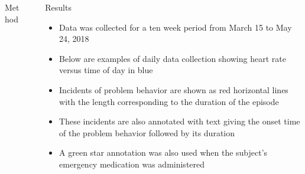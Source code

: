 \documentclass[final]{beamer}
\newlength{\sepwid}
\newlength{\onecolwid}
\newlength{\twocolwid}
\begin{document}
\begin{frame}[t]
\begin{columns}[t]
\begin{column}{\onecolwid}
\begin{alertblock}{Method}
\end{alertblock}


\end{column} %

\begin{column}{\sepwid}\end{column} %

\begin{column}{\twocolwid} %
	

\begin{alertblock}{Results}
	
	\begin{itemize}
		\item Data was collected for a ten week period from March 15 to May 24, 2018
		\item Below are examples of daily data collection showing heart rate versus time of day in blue
		\item Incidents of problem behavior are shown as red horizontal lines with the length corresponding to the duration of the episode
		\item These incidents are also annotated with text giving the onset time of the problem behavior followed by its duration
		\item A green star annotation was also used when the subject's emergency medication was administered
	\end{itemize}
	
\end{alertblock}


\begin{columns}[t,totalwidth=\twocolwid] %

\begin{column}{\onecolwid}\vspace{-.6in} %



\end{column}
\end{columns}
\end{column}
\end{columns}
\end{frame}
\end{document}
